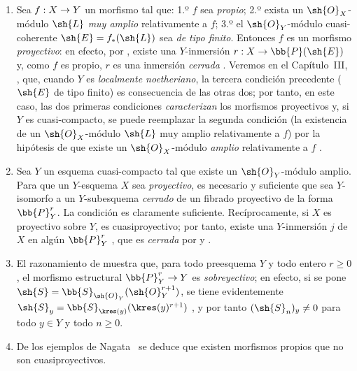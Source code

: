 \documentclass[oneside,10pt]{amsart}
\makeatletter
\renewcommand{\geq}{\geqslant}
\newcommand{\ega@arrow}[2]{\mathchoice{#1}{#2}{#2}{#2}}
\renewcommand{\to}{\ega@arrow{\longrightarrow}{\rightarrow}}
\newcommand{\oldpage}[2][]{\marginnote{\normalfont\footnotesize\textbf{#1}~|~#2}\ignorespaces}
\let\EGAOriginalLabel\label
\renewcommand{\label}[1]{\phantomsection\EGAOriginalLabel{#1}}
\makeatother
\begin{document}
\begin{remark}[5.5.4]
\label{II.5.5.4}
\medskip\noindent
\begin{enumerate}
  \item[(i)] Sea $f:X\to Y$ un morfismo tal que: 1.º $f$ sea \emph{propio}; 2.º exista un $\sh{O}_X$-módulo $\sh{L}$ \emph{muy amplio} relativamente a $f$; 3.º el $\sh{O}_Y$-módulo cuasi-coherente $\sh{E}=f_*(\sh{L})$ sea \emph{de tipo finito}.
    Entonces $f$ es un morfismo \emph{proyectivo}: en efecto, por , existe una $Y$-inmersión $r:X\to\bb{P}(\sh{E})$ y, como $f$ es propio, $r$ es una inmersión \emph{cerrada} .
    Veremos en el Capítulo~III, , que, cuando $Y$ es \emph{localmente noetheriano}, la tercera condición precedente ($\sh{E}$ de tipo finito) es consecuencia de las otras dos; por tanto, en este caso, las dos primeras condiciones \emph{caracterizan} los morfismos proyectivos y, si $Y$ es cuasi-compacto, se puede reemplazar la segunda condición (la existencia de un $\sh{O}_X$-módulo $\sh{L}$ muy amplio relativamente a $f$) por la hipótesis de que existe un $\sh{O}_X$-módulo \emph{amplio} relativamente a $f$ .
  \item[(ii)] Sea $Y$ un esquema cuasi-compacto tal que existe un $\sh{O}_Y$-módulo amplio.
    Para que un $Y$-esquema $X$ sea \emph{proyectivo}, es necesario y suficiente que sea $Y$-isomorfo a un $Y$-subesquema \emph{cerrado} de un fibrado proyectivo de la forma $\bb{P}_Y^r$.
    La condición es claramente suficiente.
\oldpage[II]{105}
    Recíprocamente, si $X$ es proyectivo sobre $Y$, es cuasiproyectivo; por tanto, existe una $Y$-inmersión $j$ de $X$ en algún $\bb{P}_Y^r$ , que es \emph{cerrada} por  y .
  \item[(iii)] El razonamiento de  muestra que, para todo preesquema $Y$ y todo entero $r\geq0$, el morfismo estructural $\bb{P}_Y^r\to Y$ es \emph{sobreyectivo}; en efecto, si se pone $\sh{S}=\bb{S}_{\sh{O}_Y}(\sh{O}_Y^{r+1})$, se tiene evidentemente $\sh{S}_y=\bb{S}_{\kres(y)}(\kres(y)^{r+1})$ , y por tanto $(\sh{S}_n)_y\neq0$ para todo $y\in Y$ y todo $n\geq0$.
  \item[(iv)] De los ejemplos de Nagata~\cite{II-26} se deduce que existen morfismos propios que no son cuasiproyectivos.
\end{enumerate}
\end{remark}
\end{document}
